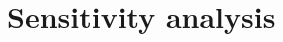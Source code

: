 \documentclass[a4paper, 5p, sort&compress]{elsarticle}%
\begin{document}
\section{Sensitivity analysis}
\label{sec:sensitivity-analysis}

%
%
%
%
%
\end{document}
